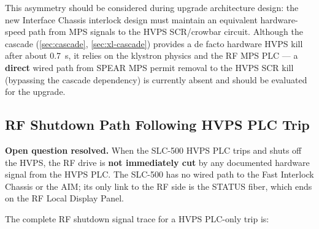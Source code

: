 This asymmetry should be considered during upgrade architecture design: the new Interface Chassis interlock design must maintain an equivalent hardware-speed path from MPS signals to the HVPS SCR/crowbar circuit. Although the cascade (\cref{sec:cascade}, \cref{sec:xl-cascade}) provides a de facto hardware HVPS kill after about \qty{0.7}{\second}, it relies on the klystron physics and the RF MPS PLC --- a \textbf{direct} wired path from SPEAR MPS permit removal to the HVPS SCR kill (bypassing the cascade dependency) is currently absent and should be evaluated for the upgrade.

\subsection{RF Shutdown Path Following HVPS PLC Trip}\label{sec:xl-rf-shutdown}


\textbf{Open question resolved.} When the SLC-500 HVPS PLC trips and shuts off the HVPS, the RF drive is \textbf{not immediately cut} by any documented hardware signal from the HVPS PLC. The SLC-500 has no wired path to the Fast Interlock Chassis or the AIM; its only link to the RF side is the STATUS fiber, which ends on the RF Local Display Panel.

The complete RF shutdown signal trace for a HVPS PLC-only trip is:


